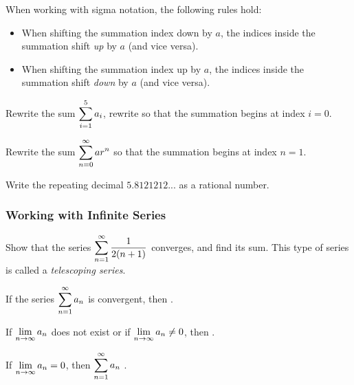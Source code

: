 \documentclass[notes]{subfiles}
\begin{document}
		\begin{rmk}
			When working with sigma notation, the following rules hold:
			\begin{itemize}
				\item When shifting the summation index down by $a$, the indices inside the summation shift \emph{up} by $a$ (and vice versa).
				\item When shifting the summation index up by $a$, the indices inside the summation shift \emph{down} by $a$ (and vice versa).
			\end{itemize}
		\end{rmk}
			\newpage
		
		\begin{ex}
			Rewrite the sum $\displaystyle \sum_{i = 1}^5 a_i$, rewrite so that the summation begins at index $i = 0$.
		\end{ex}
			
		\begin{ex}
			Rewrite the sum $\displaystyle \sum_{n = 0}^\infty ar^n$ so that the summation begins at index $n = 1$.
		\end{ex}
			
		\begin{ex}
			Write the repeating decimal $5.8121212...$ as a rational number.
		\end{ex}
			
	\subsubsection*{Working with Infinite Series}	
		\begin{ex}
			Show that the series $\displaystyle \sum_{n = 1}^\infty \dfrac{1}{2(n+1)}$ converges, and find its sum.  This type of series is called a \emph{telescoping series}.
		\end{ex}
			\newpage
			
		\begin{thm}
			If the series $\displaystyle \sum_{n=1}^\infty a_n$ is convergent, then .
		\end{thm}
		
		\begin{rmk}
			If $\displaystyle \lim_{n\to \infty} a_n$ does not exist or if $\displaystyle\lim_{n\to\infty} a_n \neq 0$, then .
		\end{rmk}
		
		\begin{rmk}
			If $\displaystyle \lim_{n\to\infty}a_n = 0$, then $\displaystyle \sum_{n = 1}^\infty a_n$ .
		\end{rmk}
		
\end{document}
